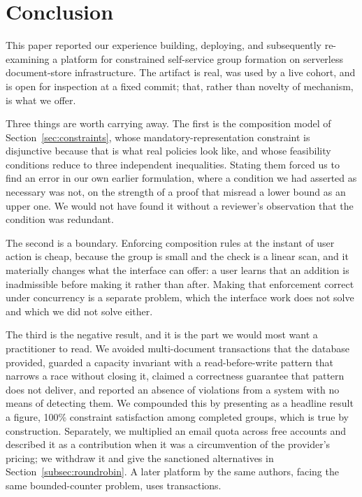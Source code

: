 \documentclass[11pt,a4paper]{article}
\theoremstyle{plain}
\theoremstyle{definition}
\theoremstyle{remark}
\begin{document}
\section{Conclusion}
\label{sec:conclusion}

This paper reported our experience building, deploying, and subsequently re-examining a platform for constrained self-service group formation on serverless document-store infrastructure. The artifact is real, was used by a live cohort, and is open for inspection at a fixed commit; that, rather than novelty of mechanism, is what we offer.

Three things are worth carrying away. The first is the composition model of Section~\ref{sec:constraints}, whose mandatory-representation constraint is disjunctive because that is what real policies look like, and whose feasibility conditions reduce to three independent inequalities. Stating them forced us to find an error in our own earlier formulation, where a condition we had asserted as necessary was not, on the strength of a proof that misread a lower bound as an upper one. We would not have found it without a reviewer's observation that the condition was redundant.

The second is a boundary. Enforcing composition rules at the instant of user action is cheap, because the group is small and the check is a linear scan, and it materially changes what the interface can offer: a user learns that an addition is inadmissible before making it rather than after. Making that enforcement correct under concurrency is a separate problem, which the interface work does not solve and which we did not solve either.

The third is the negative result, and it is the part we would most want a practitioner to read. We avoided multi-document transactions that the database provided, guarded a capacity invariant with a read-before-write pattern that narrows a race without closing it, claimed a correctness guarantee that pattern does not deliver, and reported an absence of violations from a system with no means of detecting them. We compounded this by presenting as a headline result a figure, 100\% constraint satisfaction among completed groups, which is true by construction. Separately, we multiplied an email quota across free accounts and described it as a contribution when it was a circumvention of the provider's pricing; we withdraw it and give the sanctioned alternatives in Section~\ref{subsec:roundrobin}. A later platform by the same authors, facing the same bounded-counter problem, uses transactions.
\end{document}
